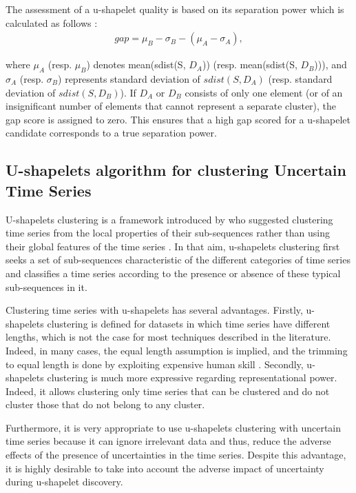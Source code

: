 The assessment of a u-shapelet quality is based on its separation power which is calculated as follows :
\begin{eqnarray}
gap=\mu_{B}-\sigma_{B}-(\mu_{A}-\sigma_{A}),
\end{eqnarray}


where $\mu_{A}$ (resp. $\mu_{B}$) denotes mean(sdist(S, $D_A$)) (resp. mean(sdist(S, $D_B$))), and
$\sigma_{A}$ (resp. $\sigma_{B}$) represents standard deviation of $sdist(S,
D_A)$ (resp. standard deviation of $sdist(S, D_B)$).
If $D_A$ or $D_B$ consists of only one element (or of an insignificant number of elements that cannot represent a separate cluster), the gap score is assigned to zero. This ensures that a  high gap scored for a u-shapelet candidate corresponds to a true separation power.



\subsection{U-shapelets algorithm for clustering Uncertain Time Series }

U-shapelets clustering is a framework introduced by\cite{zakaria2012clustering} who suggested clustering time series from the local properties of their sub-sequences rather than
using their global features of the time series \cite{zhang2016unsupervised}. In that aim, u-shapelets clustering first seeks a set of sub-sequences characteristic of the different categories of time series and classifies a time series according to the presence or absence of these typical sub-sequences in it. 

Clustering time series with u-shapelets has several advantages. Firstly, u-shapelets clustering is defined for datasets in which  time series have different lengths, which is not the case for most techniques described in the literature. Indeed, in many cases, the equal length assumption is implied,
and the trimming to equal length is done by exploiting expensive human skill \cite{ulanova2015scalable}.  Secondly, u-shapelets clustering is much more expressive regarding representational power. Indeed, it allows clustering only time series that can be
clustered and do not cluster those that do not belong to any cluster.

Furthermore, it is very appropriate to use u-shapelets clustering with uncertain time series because it can ignore irrelevant data and thus, reduce the adverse effects of the presence of uncertainties in the time series. Despite this advantage, it is highly desirable to take into account the adverse impact of uncertainty during u-shapelet discovery.

